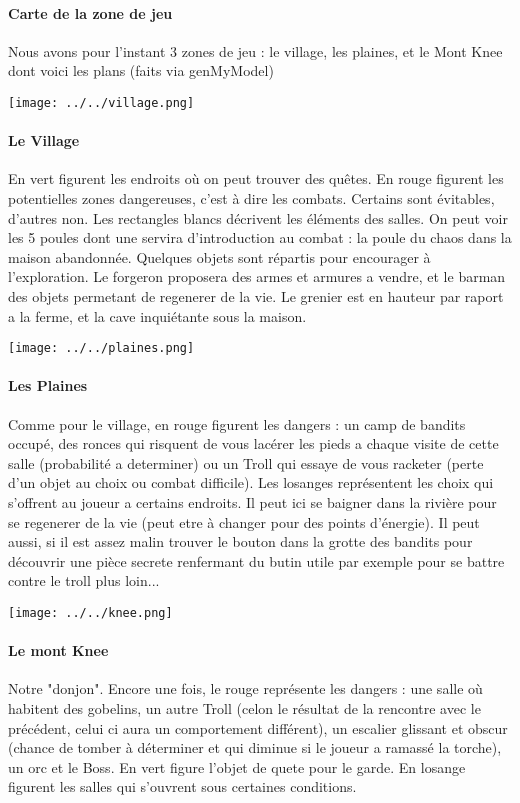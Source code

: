 \documentclass[11pt,a4paper]{report}
\begin{document}
\paragraph{Carte de la zone de jeu}
Nous avons pour l'instant 3 zones de jeu : le village, les plaines, et le Mont Knee dont voici les plans (faits via genMyModel)
\centerline{\texttt{[image: ../../village.png]}}
\paragraph{Le Village}
En vert figurent les endroits où on peut trouver des quêtes. En rouge figurent les potentielles zones dangereuses, c'est à dire les combats. Certains sont évitables, d'autres non. Les rectangles blancs décrivent les éléments des salles. On peut voir les 5 poules dont une servira d'introduction au combat : la poule du chaos dans la maison abandonnée. Quelques objets sont répartis pour encourager à l'exploration. Le forgeron proposera des armes et armures a vendre, et le barman des objets permetant de regenerer de la vie. Le grenier est en hauteur par raport a la ferme, et la cave inquiétante sous la maison.
\centerline{\texttt{[image: ../../plaines.png]}}
\paragraph{Les Plaines}
Comme pour le village, en rouge figurent les dangers : un camp de bandits occupé, des ronces qui risquent de vous lacérer les pieds a chaque visite de cette salle (probabilité a determiner) ou un Troll qui essaye de vous racketer (perte d'un objet au choix ou combat difficile). Les losanges représentent les choix qui s'offrent au joueur a certains endroits. Il peut ici se baigner dans la rivière pour se regenerer de la vie (peut etre à changer pour des points d'énergie). Il peut aussi, si il est assez malin trouver le bouton dans la grotte des bandits pour découvrir une pièce secrete renfermant du butin utile par exemple pour se battre contre le troll plus loin...
\centerline{\texttt{[image: ../../knee.png]}}
\paragraph{Le mont Knee}
Notre "donjon". Encore une fois, le rouge représente les dangers : une salle où habitent des gobelins, un autre Troll (celon le résultat de la rencontre avec le précédent, celui ci aura un comportement différent), un escalier glissant et obscur (chance de tomber à déterminer et qui diminue si le joueur a ramassé la torche), un orc et le Boss. En vert figure l'objet de quete pour le garde. En losange figurent les salles qui s'ouvrent sous certaines conditions.
\end{document}
